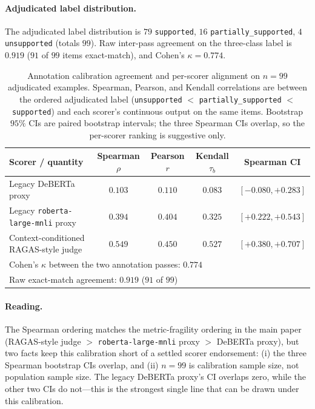 \documentclass[11pt]{article}
\begin{document}
\paragraph{Adjudicated label distribution.}
The adjudicated label distribution is $79$ \texttt{supported},
$16$ \texttt{partially\_supported}, $4$ \texttt{unsupported} (totals
$99$). Raw inter-pass agreement on the three-class label is
$0.919$ ($91$ of $99$ items exact-match), and Cohen's
$\kappa = 0.774$.

\begin{table}[!htb]
\centering
\caption{Annotation calibration agreement and per-scorer alignment
on $n=99$ adjudicated examples.
Spearman, Pearson, and Kendall correlations are between the
ordered adjudicated label
(\texttt{unsupported} $<$ \texttt{partially\_supported} $<$
\texttt{supported}) and each scorer's continuous output on the same
items. Bootstrap $95\%$ CIs are paired bootstrap intervals; the three
Spearman CIs overlap, so the per-scorer ranking is suggestive only.}
\label{tab:supp:human_calibration}
\footnotesize
\begin{tabular}{lcccc}
\toprule
Scorer / quantity & Spearman $\rho$ & Pearson $r$ & Kendall $\tau_b$ & Spearman CI \\
\midrule
Legacy DeBERTa proxy             & $0.103$ & $0.110$ & $0.083$ & $[-0.080, +0.283]$ \\
Legacy \texttt{roberta-large-mnli} proxy & $0.394$ & $0.404$ & $0.325$ & $[+0.222, +0.543]$ \\
Context-conditioned RAGAS-style judge & $0.549$ & $0.450$ & $0.527$ & $[+0.380, +0.707]$ \\
\midrule
\multicolumn{5}{l}{Cohen's $\kappa$ between the two annotation passes: $0.774$} \\
\multicolumn{5}{l}{Raw exact-match agreement: $0.919$ ($91$ of $99$)} \\
\bottomrule
\end{tabular}
\end{table}

\paragraph{Reading.} The Spearman ordering matches the
metric-fragility ordering in the main paper (RAGAS-style judge $>$
\texttt{roberta-large-mnli} proxy $>$ DeBERTa proxy), but two facts
keep this calibration short of a settled scorer endorsement: (i) the
three Spearman bootstrap CIs overlap, and (ii) $n=99$ is calibration
sample size, not population sample size. The legacy DeBERTa proxy's
CI overlaps zero, while the other two CIs do not---this is the
strongest single line that can be drawn under this calibration.
\end{document}
